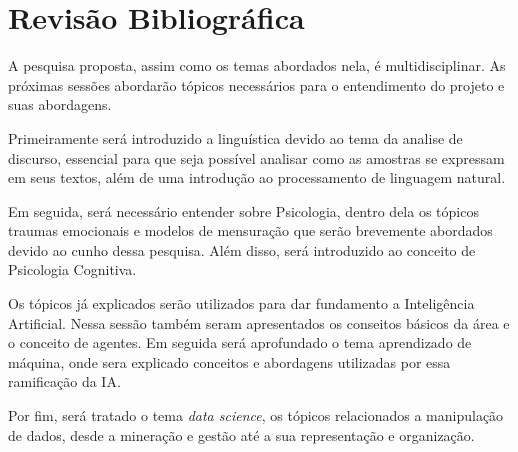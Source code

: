 \chapter{Revisão Bibliográfica}
A pesquisa proposta, assim como os temas abordados nela, é multidisciplinar. As próximas sessões abordarão tópicos necessários para o entendimento do projeto e suas abordagens.

Primeiramente será introduzido a linguística devido ao tema da analise de discurso, essencial para que seja possível analisar como as amostras se expressam em seus textos, além de uma introdução ao processamento de linguagem natural.

Em seguida, será necessário entender sobre Psicologia, dentro dela os tópicos traumas emocionais e modelos de mensuração que serão brevemente abordados devido ao cunho dessa pesquisa. Além disso, será introduzido ao conceito de Psicologia Cognitiva.

Os tópicos já explicados serão utilizados para dar fundamento a Inteligência Artificial. Nessa sessão também seram apresentados os conseitos básicos da área e o conceito de agentes. Em seguida será aprofundado o tema aprendizado de máquina, onde sera explicado conceitos e abordagens utilizadas por essa ramificação da IA.

Por fim, será tratado o tema \textit{data science}, os tópicos relacionados a manipulação de dados, desde a mineração e gestão até a sua representação e organização.






